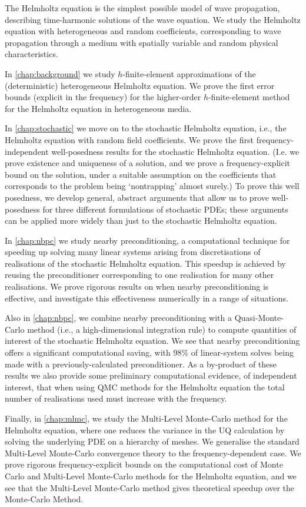 The Helmholtz equation is the simplest possible model of wave propagation, describing time-harmonic solutions of the wave equation. We study the Helmholtz equation with heterogeneous and random coefficients, corresponding to wave propagation through a medium with spatially variable and random physical characteristics.

In \cref{chap:background} we study $h$-finite-element approximations of the (deterministic) heterogeneous Helmholtz equation. We prove the first error bounds (explicit in the frequency) for the higher-order $h$-finite-element method for the Helmholtz equation in heterogeneous media.

In \cref{chap:stochastic} we move on to the stochastic Helmholtz equation, i.e., the Helmholtz equation with random field coefficients. We prove the first frequency-independent well-posedness results for the stochastic Helmholtz equation. (I.e. we prove existence and uniqueness of a solution, and we prove a frequency-explicit bound on the solution, under a suitable assumption on the coefficients that corresponds to the problem being `nontrapping' almost surely.) To prove this well posedness, we develop general, abstract arguments that allow us to prove well-posedness for three different formulations of stochastic PDEs; these arguments can be applied more widely than just to the stochastic Helmholtz equation.

In \cref{chap:nbpc} we study nearby preconditioning, a computational technique for speeding up solving many linear systems arising from discretisations of realisations of the stochastic Helmholtz equation. This speedup is achieved by reusing the preconditioner corresponding to one realisation for many other realisations. We prove rigorous results on when nearby preconditioning is effective, and investigate this effectiveness numerically in a range of situations.

Also in \cref{chap:nbpc}, we combine nearby preconditioning with a Quasi-Monte-Carlo method (i.e., a high-dimensional integration rule) to compute quantities of interest of the stochastic Helmholtz equation. We see that nearby preconditioning offers a significant computational saving, with 98\% of linear-system solves being made with a previously-calculated preconditioner. As a by-product of these results we also provide some preliminary computational evidence, of independent interest, that when using QMC methods for the Helmholtz equation the total number of realisations used must increase with the frequency.

Finally, in \cref{chap:mlmc}, we study the Multi-Level Monte-Carlo method for the Helmholtz equation, where one reduces the variance in the UQ calculation  by solving the underlying PDE on a hierarchy of meshes. We generalise the standard Multi-Level Monte-Carlo convergence theory to the frequency-dependent case.  We prove rigorous frequency-explicit bounds on the computational cost of Monte Carlo and Multi-Level Monte-Carlo methods for the Helmholtz equation, and we see that the Multi-Level Monte-Carlo method gives theoretical speedup over the Monte-Carlo Method.
